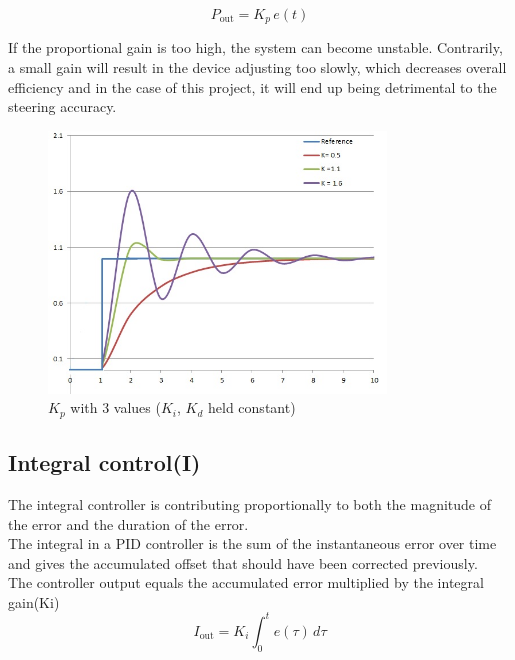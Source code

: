 $$ P_{\mathrm{out}}=K_p\,{e(t)}$$  

If the proportional gain is too high, the system can become unstable. Contrarily, a small gain will result in the device adjusting too slowly, which decreases overall efficiency and in the case of this project, it will end up being detrimental to the steering accuracy.


\begin{figure}[h!]
  \centering
  \includegraphics[width=0.8\textwidth]{figures/PIDP.jpg}
  
  \caption{$K_p$ with 3 values ($K_i$, $K_d$ held constant)} 
  \label{PID controller}
\end{figure}


\newpage

\subsection {Integral control(I)}
The integral controller is contributing proportionally to both the magnitude of the error and the duration of the error. \\
The integral in a PID controller is the sum of the instantaneous error over time and gives the accumulated offset that should have been corrected previously. \\ 

The controller output equals the accumulated error multiplied by the integral gain(Ki)\\
$$I_{\mathrm{out}}=K_{i}\int_{0}^{t}{e(\tau)}\,{d\tau}$$ 

